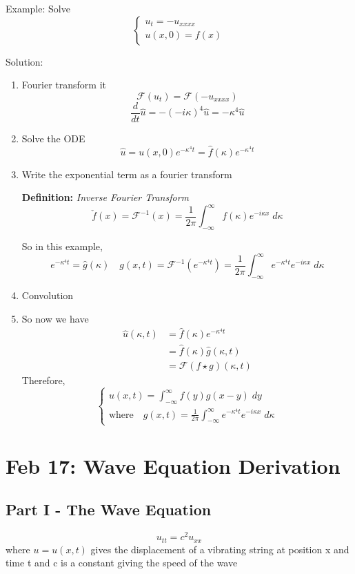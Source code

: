 \documentclass[12pt]{article}
\renewcommand{\hat}[1]{\widehat{#1}}
\newcommand{\F}{\mathcal{F}}
\begin{document}
Example: Solve 
\[\begin{cases}
    u_t = -u_{xxxx}\\
    u(x, 0) = f(x)
\end{cases}\]

Solution:
\begin{enumerate}
    \item Fourier transform it
    \[\F\left(u_t\right) = \F\left(-u_{xxxx}\right)\]
    \[\frac{d}{dt} \hat{u} = -(-i\kappa)^4 \hat{u} = -\kappa^4 \hat{u}\]
    \item Solve the ODE 
    \[\hat{u} = u(x, 0)e^{-\kappa^4t} = \hat{f}(\kappa) e^{-\kappa^4t} \]
    \item Write the exponential term as a fourier transform 
    
    \textbf{Definition:} \emph{Inverse Fourier Transform}
    \[\boxed{\check{f}(x) = \mathcal{F}^{-1}(x) = \frac{1}{2\pi} \int_{-\infty}^\infty f(\kappa) e^{-i\kappa x}\; d\kappa}\]

    So in this example, 
    \[e^{-\kappa^4t} = \hat{g}(\kappa) \quad g(x, t) = \mathcal{F}^{-1}\left(e^{-\kappa^4 t}\right) = \frac{1}{2\pi} \int_{-\infty}^\infty e^{-\kappa^4 t} e^{-i\kappa x}\; d\kappa\]

    \item Convolution 
    \item 
    So now we have 
    \begin{align*}
        \hat{u}(\kappa, t) &= \hat{f}(\kappa)e^{-\kappa^4 t}\\
        &= \hat{f}(\kappa) \hat{g}(\kappa, t)\\
        &= \F\left(f \star g\right)(\kappa, t)
    \end{align*}
    Therefore, 
    \[\boxed{\begin{cases}
        u(x, t) = \int_{-\infty}^\infty f(y) g(x - y)\; dy\\
        \text{where} \quad g(x, t) = \frac{1}{2\pi} \int_{-\infty}^\infty e^{-\kappa^4 t} e^{-i\kappa x}\; d\kappa
    \end{cases}}\]
\end{enumerate}

\section{Feb 17: Wave Equation Derivation}
\subsection*{Part I - The Wave Equation}
\[u_{tt} = c^2 u_{xx}\]
where $u = u(x, t)$ gives the displacement of a vibrating string at position x and time t and c is a constant giving the speed of the wave  
\end{document}
